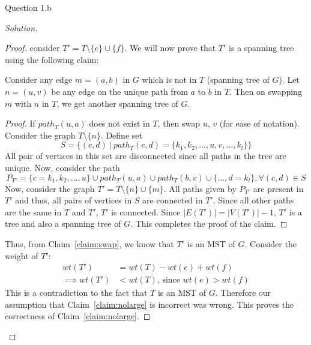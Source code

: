 \begin{solution}{Question 1.b}
\begin{proof}[Solution]
\begin{proof}
            consider $T'=T\setminus\{e\}\cup\{f\}$. We will now prove that $T'$ is a spanning tree using the following claim:
            \begin{claim}\label{claim:swap}
                Consider any edge $m=(a, b)$ in $G$ which is not in $T$ (spanning tree of $G$). Let $n=(u, v)$ be any edge on the unique path from $a$ to $b$ in $T$. Then on swapping $m$ with $n$ in $T$, we get another spanning tree of $G$.
            \end{claim}
            \begin{proof}
                If $path_T(u, a)$ does not exist in $T$, then swap $u$, $v$ (for ease of notation). Consider the graph $T\setminus\{n\}$. Define set
                \begin{equation}
                    S=\{(c, d)\ |\ path_T(c, d)=\{k_1, k_2, \ldots, u, v, \ldots, k_l\}\}
                \end{equation}
                All pair of vertices in this set are disconnected since all paths in the tree are unique. Now, consider the path
                \begin{equation}
                    P_{T'}=\{c=k_1, k_2, \ldots, u\}\cup path_T(u, a)\cup path_T(b, v)\cup \{\ldots, d=k_l\}, \forall (c, d)\in S
                \end{equation}
                Now, consider the graph $T'=T\setminus\{n\}\cup\{m\}$. All paths given by $P_{T'}$ are present in $T'$ and thus, all pairs of vertices in $S$ are connected in $T'$. Since all other paths are the same in $T$ and $T'$, $T'$ is connected. Since $|E(T')|=|V(T')|-1$, $T'$ is a tree and also a spanning tree of $G$. This completes the proof of the claim.
            \end{proof}
            Thus, from Claim~\ref{claim:swap}, we know that $T'$ is an MST of $G$. Consider the weight of $T'$:
            \begin{equation}
                \begin{split}
                    wt(T')&=wt(T)-wt(e)+wt(f)\\
                    \implies wt(T')&<wt(T)\text{, since }wt(e)>wt(f)
                \end{split}
            \end{equation}
            This is a contradiction to the fact that $T$ is an MST of $G$. Therefore our assumption that Claim~\ref{claim:nolarge} is incorrect was wrong. This proves the correctness of Claim~\ref{claim:nolarge}.
        \end{proof}

\end{proof}
\end{solution}
